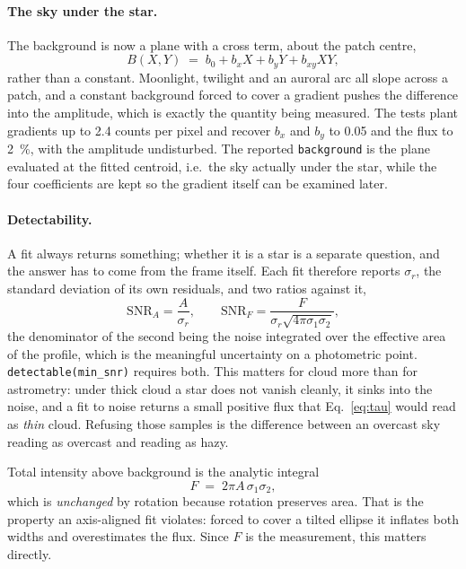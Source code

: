\documentclass[11pt,a4paper]{article}
\begin{document}
\paragraph{The sky under the star.} The background is now a plane with a
cross term, about the patch centre,
\begin{equation}
  B(X,Y) \;=\; b_0 + b_xX + b_yY + b_{xy}XY ,
\end{equation}
rather than a constant. Moonlight, twilight and an auroral arc all slope across
a patch, and a constant background forced to cover a gradient pushes the
difference into the amplitude, which is exactly the quantity being measured.
The tests plant gradients up to \num{2.4} counts per pixel and recover $b_x$ and
$b_y$ to \num{0.05} and the flux to \SI{2}{\percent}, with the amplitude
undisturbed. The reported \texttt{background} is the plane evaluated at the
fitted centroid, i.e.\ the sky actually under the star, while the four
coefficients are kept so the gradient itself can be examined later.

\paragraph{Detectability.} A fit always returns something; whether it is a star
is a separate question, and the answer has to come from the frame itself. Each
fit therefore reports $\sigma_r$, the standard deviation of its own residuals,
and two ratios against it,
\begin{equation}
  \mathrm{SNR}_A = \frac{A}{\sigma_r},
  \qquad
  \mathrm{SNR}_F = \frac{F}{\sigma_r\sqrt{4\pi\sigma_1\sigma_2}} ,
  \label{eq:snr}
\end{equation}
the denominator of the second being the noise integrated over the effective
area of the profile, which is the meaningful uncertainty on a photometric
point. \texttt{detectable(min\_snr)} requires both. This matters for cloud more
than for astrometry: under thick cloud a star does not vanish cleanly, it sinks
into the noise, and a fit to noise returns a small positive flux that
Eq.~\eqref{eq:tau} would read as \emph{thin} cloud. Refusing those samples is
the difference between an overcast sky reading as overcast and reading as
hazy.

Total intensity above background is the analytic integral
\begin{equation}
  F \;=\; 2\pi A\,\sigma_1\sigma_2 ,
\end{equation}
which is \emph{unchanged} by rotation because rotation preserves area. That is
the property an axis-aligned fit violates: forced to cover a tilted ellipse it
inflates both widths and overestimates the flux. Since $F$ is the measurement,
this matters directly.
\end{document}
